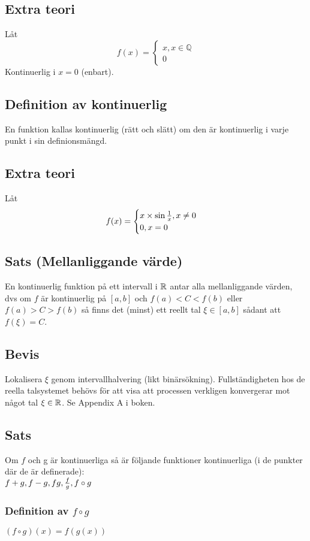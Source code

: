 \documentclass{article}
\begin{document}
\subsection{Extra teori}
Låt
$$
f(x)=
\begin{cases}
  x, x\in \mathbb Q \\
  0
\end{cases}
$$
Kontinuerlig i $x=0$ (enbart).

\subsection{Definition av kontinuerlig}
En funktion kallas kontinuerlig (rätt och slätt) om den är kontinuerlig i varje punkt
i sin definionsmängd.

\subsection{Extra teori}
Låt
$$
f(x)=
\begin{cases}
  x\times \sin{\frac{1}{x}}, x\neq 0\\
  0, x=0
\end{cases}
$$

\subsection{Sats (Mellanliggande värde)}
En kontinuerlig funktion på ett intervall i ${\mathbb R}$ antar alla mellanliggande värden,
dvs om $f$ är  kontinuerlig på $\left[ a, b \right]$ och $f(a) < C < f(b)$
eller $f(a) > C > f(b)$ så finns det (minst) ett reellt tal $\xi \in \left[ a,b \right]$
sådant att $f(\xi) = C$.

\subsection{Bevis}
Lokalisera $\xi$ genom intervallhalvering (likt binärsökning). Fullständigheten hos de reella talsystemet
behövs för att visa att processen verkligen konvergerar mot något tal $\xi\in{\mathbb R}$. Se Appendix A i boken.

\subsection{Sats}
Om $f$ och g är kontinuerliga så är följande funktioner kontinuerliga (i de punkter där de är definerade):\\
$f+g, f-g, fg, \frac{f}{g}, f\circ g$

\subsubsection{Definition av $f\circ g$}
$(f\circ g)(x) = f(g(x))$
\end{document}
